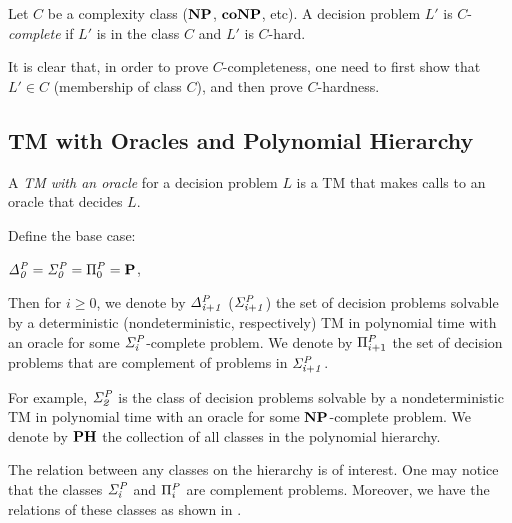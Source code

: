 \begin{definition}
	Let $C$ be a complexity class ($\textbf{NP}$, $\textbf{coNP}$, etc).
	A decision problem $L'$ is $C$-\textit{complete} if $L'$ is in the class 
	$C$ and $L'$ is $C$-hard.
\end{definition}
It is clear that, in order to prove $C$-completeness, one need to first show
that $L' \in C$ (membership of class $C$), and then prove $C$-hardness.



\subsection{TM with Oracles and Polynomial Hierarchy}
A \textit{TM with an oracle} for a decision problem $L$ is a TM that makes calls 
to an oracle that decides $L$.

\begin{definition}
	Define the base case:
	\begin{center}
		$\mathit{\Delta^P_{0}} = \mathit{\Sigma^P_{0}} = \Pi^P_{0} = \textbf{P}$,
	\end{center}
	Then for $i \geq 0$, we denote by $\mathit{\Delta^P_{i+1}}$ ($\mathit{\Sigma^P_{i+1}}$) 
	the set of decision problems solvable
	by a deterministic (nondeterministic, respectively) TM 
	in polynomial time with an oracle for some $\mathit{\Sigma^P_{i}}$-complete problem.
	We denote by $\Pi^P_{i+1}$ the set of decision problems that are complement
	of problems in $\mathit{\Sigma^P_{i+1}}$.
\end{definition}
For example, $\mathit{\Sigma^P_{2}}$ is the class of decision problems solvable by a nondeterministic
TM in polynomial time with an oracle for some $\textbf{NP}$-complete problem.
We denote by $\textbf{PH}$ the collection of all classes in the polynomial hierarchy.

The relation between any classes on the hierarchy is of interest.
One may notice that the classes $\mathit{\Sigma^P_{i}}$ and $\Pi^P_{i}$ are
complement problems.
Moreover, we have the relations of these classes as shown in .

